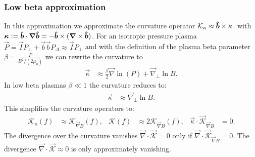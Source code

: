 \subsubsection{Low beta approximation}\label{sec:lowbetaapprox}
In this approximation we approximate the curvature operator $\mathcal K_\kappa \approx \bm{\hat{b}}\times\kappa$.
  with
  ${\boldsymbol{\kappa}} := \bm{\hat{b}} \cdot {\boldsymbol{\nabla}}\bm{\hat{b}} = -\bm{\hat{b}} \times({\boldsymbol{\nabla}}\times \bm{\hat{b}})$.
For an isotropic pressure plasma \(\vec{P} = \vec{I} P_\perp + \vec{b} \vec{b} P_\Delta \approx \vec{I} P_\perp\) and with the definition of the plasma beta parameter
\(\beta = \frac{P}{B^2/(2 \mu_0) } \)
we can rewrite the curvature to
\begin{align}
 \vec{\kappa} &\approx \frac{\beta}{2} \vec{\nabla} \ln(P) +\vec{\nabla}_\perp \ln{B} .
\end{align}
In low beta plasmas \(\beta\ll1\) the curvature reduces to:
\begin{align}\label{eq:kappalowbeta}
 \vec{\kappa} & \approx \vec{\nabla}_\perp \ln{B} .
\end{align}
This simplifies the curvature operators to:
\begin{align}
\mathcal{K}_{\kappa}(f)   &\approx  \mathcal{K}_{\vec{\nabla}  B}(f),  &
\mathcal{K} (f) &\approx 2\mathcal{K}_{\vec{\nabla}  B} (f) , &
 \vec{\kappa} \cdot \vec{\mathcal{K}}_{\vec{\nabla}  B} &= 0.
\end{align}
The divergence over the curvature vanishes \( \vec{\nabla} \cdot \vec{ \mathcal{K} } = 0\) only if \( \vec{\nabla} \cdot \vec{ \mathcal{K}}_{\vec{\nabla}  B}   = 0\).
The divergence \( \vec{\nabla} \cdot \vec{ \mathcal{K} } \approx 0\) is only approximately vanishing.
